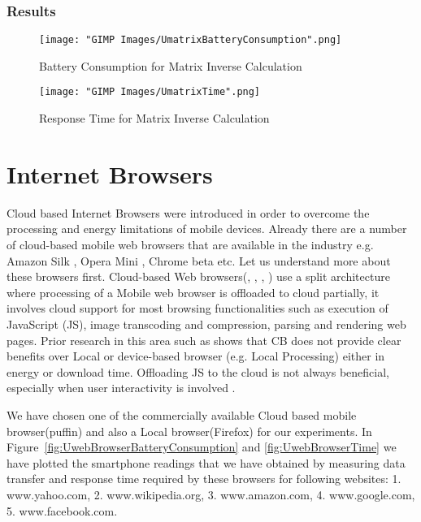 \documentclass{report}
\begin{document}
\subsection{Results}
\begin{figure}[h]
  \centering
  \texttt{[image: "GIMP Images/UmatrixBatteryConsumption".png]}
  \caption{Battery Consumption for Matrix Inverse Calculation}
  \label{fig:UmatrixBatteryConsumption}
\end{figure}

\begin{figure}[h]
  \centering
  \texttt{[image: "GIMP Images/UmatrixTime".png]}
  \caption{Response Time for Matrix Inverse Calculation}
  \label{fig:UmatrixTime}
\end{figure}


\chapter{Internet Browsers}
Cloud based Internet Browsers were introduced in order to overcome the processing and energy limitations
of mobile devices. Already there are a number of cloud-based mobile web browsers that are available in the industry e.g. Amazon Silk \cite{AmazonSilk}, Opera Mini \cite{OperaMini}, Chrome beta \cite{ChromeBeta} etc. Let us understand more about these browsers first.
Cloud-based Web browsers(\cite{AmazonSilk}, \cite{ChromeBeta}, \cite{OperaMini}, \cite{wang2013accelerating}) use a split architecture where processing of a Mobile web
browser is offloaded to cloud partially, it involves cloud support for most browsing functionalities such as execution of JavaScript (JS), image transcoding and compression, parsing and rendering web pages.
Prior research in this area such as \cite{sivakumar2014cloud} shows that CB does not provide clear benefits over Local or device-based browser (e.g. Local Processing) either in energy or download time. Offloading JS to the cloud is not always beneficial, especially when user interactivity is involved \cite{sivakumar2014cloud}. 

We have chosen one of the commercially available Cloud based mobile browser(puffin) and also a Local browser(Firefox) for our experiments. In Figure~\ref{fig:UwebBrowserBatteryConsumption} and \ref{fig:UwebBrowserTime} we have plotted the smartphone readings that we have obtained by measuring data transfer and response time required by these browsers for following websites: 1. www.yahoo.com, 2. www.wikipedia.org, 3. www.amazon.com, 4. www.google.com, 5. www.facebook.com.
\end{document}
